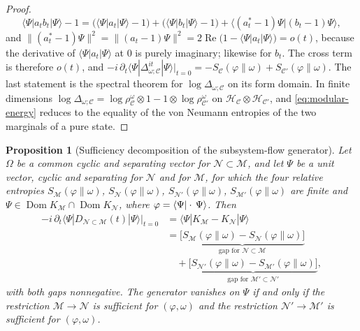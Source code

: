 \documentclass[a4paper,11pt]{article}
\newtheorem{proposition}[theorem]{Proposition}
\theoremstyle{definition}
\newcommand{\nn}{\nonumber}
\newcommand{\mN}{\mathcal{N}}
\newcommand{\mM}{\mathcal{M}}
\begin{document}
\begin{proof}
\begin{equation}
 \langle\Psi|a_tb_t|\Psi\rangle-1
 =\bigl(\langle\Psi|a_t|\Psi\rangle-1\bigr)+\bigl(\langle\Psi|b_t|\Psi\rangle-1\bigr)
 +\langle(a_t^*-1)\Psi|(b_t-1)\Psi\rangle,
\end{equation}
and $\|(a_t^*-1)\Psi\|^2=\|(a_t-1)\Psi\|^2=2\operatorname{Re}\bigl(1-\langle\Psi|a_t|\Psi\rangle\bigr)=o(t)$, because the derivative of $\langle\Psi|a_t|\Psi\rangle$ at $0$ is purely imaginary; likewise for $b_t$. The cross term is therefore $o(t)$, and
$-i\,\partial_t\langle\Psi|\Delta_{\omega;\mathcal C}^{it}|\Psi\rangle|_{t=0}=-S_{\mathcal C}(\varphi\|\omega)+S_{\mathcal C'}(\varphi\|\omega)$. The last statement is the spectral theorem for $\log\Delta_{\omega;\mathcal C}$ on its form domain. In finite dimensions $\log\Delta_{\omega;\mathcal C}=\log\rho^\omega_{\mathcal C}\otimes1-1\otimes\log\rho^\omega_{\mathcal C'}$ on $\mathcal H_{\mathcal C}\otimes\mathcal H_{\mathcal C'}$, and \eqref{eq:modular-energy} reduces to the equality of the von Neumann entropies of the two marginals of a pure state.
\end{proof}

\begin{proposition}[Sufficiency decomposition of the subsystem-flow generator]\label{prop:sufficiency}
Let $\Omega$ be a common cyclic and separating vector for $\mN\subset\mM$, and let $\Psi$ be a unit vector, cyclic and separating for $\mN$ and for $\mM$, for which the four relative entropies $S_{\mM}(\varphi\|\omega)$, $S_{\mN}(\varphi\|\omega)$, $S_{\mN'}(\varphi\|\omega)$, $S_{\mM'}(\varphi\|\omega)$ are finite and $\Psi\in\operatorname{Dom}K_{\mM}\cap\operatorname{Dom}K_{\mN}$, where $\varphi=\braket{\Psi|\cdot\,\Psi}$. Then
\begin{align}
 -i\,\partial_t\langle\Psi|D_{\mN\subset\mM}(t)|\Psi\rangle\big|_{t=0}
 &=\langle\Psi|K_{\mM}-K_{\mN}|\Psi\rangle\nn\\
 &=\underbrace{\bigl[S_{\mM}(\varphi\|\omega)-S_{\mN}(\varphi\|\omega)\bigr]}_{\text{gap for }\mN\subset\mM}\nn\\
 &\quad+\underbrace{\bigl[S_{\mN'}(\varphi\|\omega)-S_{\mM'}(\varphi\|\omega)\bigr]}_{\text{gap for }\mM'\subset\mN'} ,
 \label{eq:sufficiency-decomposition}
\end{align}
with both gaps nonnegative. The generator vanishes on $\Psi$ if and only if the restriction $\mM\to\mN$ is sufficient for $(\varphi,\omega)$ and the restriction $\mN'\to\mM'$ is sufficient for $(\varphi,\omega)$.
\end{proposition}
\end{document}

